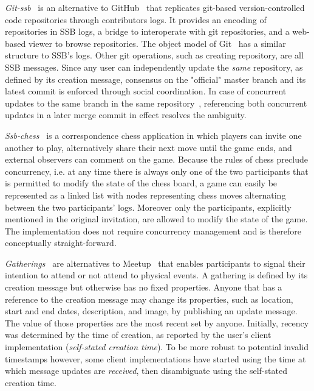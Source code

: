 \documentclass[9pt,sigconf]{acmart}
\begin{document}
\textit{Git-ssb}~\cite{git-ssb} is an alternative to GitHub~\cite{github} that
replicates git-based version-controlled code repositories through contributors
logs. It provides an encoding of repositories in SSB logs, a bridge to
interoperate with git repositories, and a web-based viewer to browse
repositories. The object model of Git~\cite{chacon2014pro} has a similar
structure to SSB's logs. Other git operations, such as creating repository, are
all SSB messages. Since any user can independently update the \textit{same} repository, as defined by its creation message, consensus on the "official" master branch and its latest commit is enforced
through social coordination. In case of concurrent updates to the same branch
in the same repository~\cite{git-ssb-push-conflict}, referencing both concurrent
updates in a later merge commit in effect resolves
the ambiguity.

\textit{Ssb-chess}~\cite{ssb-chess} is a correspondence chess application in
which players can invite one another to play, alternatively share their next
move until the game ends, and external observers can comment on the game.
Because the rules of chess preclude concurrency,  i.e. at any time there is always
 only one of the two participants that is permitted to modify the state of the chess board,
 a game can easily be represented as a linked list with nodes
representing chess moves alternating between the two participants' logs.
Moreover only the participants, explicitly mentioned in the original invitation, are
allowed to modify the state of the game. The implementation does not require
concurrency management and is therefore conceptually straight-forward.

\textit{Gatherings}~\cite{patch-gatherings} are alternatives to
Meetup~\cite{meetup.com} that enables participants to signal their intention to
attend or not attend to physical events. A gathering is defined by its creation message
but otherwise has no fixed properties. Anyone that has a reference to the creation message may
change its properties, such as location, start and end dates, description, and
image, by publishing an update message. The value of those properties are the
most recent set by anyone. Initially, recency was determined by the time of
creation, as reported by the user's client implementation (\textit{self-stated
creation time}). To be more robust to potential invalid
timestamps however, some client implementations have started using the time at
which message updates are \textit{received}, then disambiguate using the
self-stated creation time.
\end{document}
